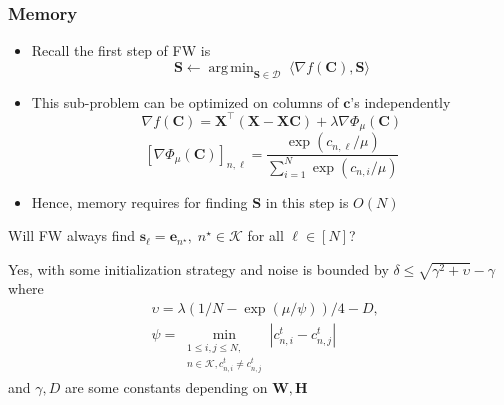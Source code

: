 \documentclass[10pt,xcolor={usenames,dvipsnames,table}]{beamer}
\newcommand{\norm}[1]{\left\lVert#1\right\rVert}
\newcommand{\abs}[1]{\left\lvert#1\right\rvert}
\newcommand{\T}{\!\top\!}
\DeclareMathOperator*{\argmin}{arg\,min}
\begin{document}
\begin{frame}
\frametitle{Memory}    
\begin{itemize}
    \item Recall the first step of FW is
        \[
        \bm{S} \leftarrow \argmin_{\bm{S} \in \mathcal{D}} \; \langle \nabla f(\bm{C}), \bm{S} \rangle
        \] 
    \item This sub-problem can be optimized on columns of $\bm{c}$'s independently
\[
\nabla f(\bm{C}) = \bm{X}^{\T}(\bm{X} - \bm{X}\bm{C}) + \lambda \nabla \varPhi_{\mu}(\bm{C})
\] 
\[
[\nabla \varPhi_{\mu}(\bm{C})]_{n,\ell} = \dfrac{\exp (c_{n, \ell}/\mu)}{\sum^{N}_{i=1} \exp(c_{n, i}/\mu)}
\] 
    \item Hence, memory requires for finding $\bm{S}$ in this step is $O(N)$
\end{itemize}

\begin{block}
    
    Will FW always find $ \bm{s}_\ell = \bm{e}_{n^{\star}}, \; n^{\star} \in \mathcal{K}$ for all $\ell \in [N]$?
\end{block}

    Yes, with some initialization strategy and noise is bounded by
    $ \delta \leq  \sqrt{\gamma^2 + \upsilon } -\gamma $ 
where 
\begin{align*}
&\upsilon= \lambda (1/N - \exp(\mu/\psi))/4 - D ,\\
&\psi = \min_{\substack{1 \leq i,j \leq N, \\ n \in \mathcal{K},  c^t_{n,i} \neq c^t_{n,j}}} \abs{c^t_{n,i} - c^t_{n, j}} 
\end{align*}
and $\gamma, D$ are some constants depending on  $\bm{W}, \bm{H}$

\end{frame}
\end{document}
